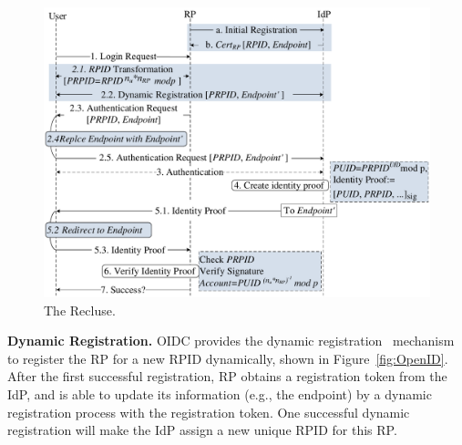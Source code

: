 \begin{figure}[t]
  \centering
  \includegraphics[width=\linewidth]{fig/overview1.pdf}
  \caption{The Recluse.}
  \label{fig:Recluse}
\end{figure}

\noindent\textbf{Dynamic Registration.} OIDC provides the dynamic registration~\cite{DynamicRegistration} mechanism to register the RP for a new RPID dynamically, shown in Figure~\ref{fig:OpenID}. 
After the first successful registration, RP obtains a registration token from the IdP, and is able to update its information (e.g., the endpoint) by a dynamic registration process with the  registration token.
One successful dynamic registration will make the IdP assign a new unique RPID for this RP.


